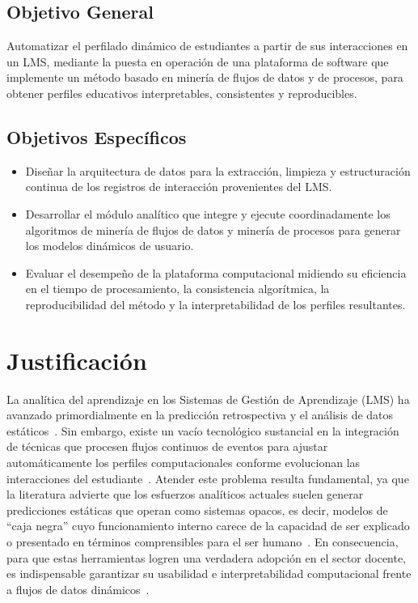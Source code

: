 \subsection{Objetivo General}
Automatizar el perfilado dinámico de estudiantes a partir de sus interacciones en un LMS, mediante la puesta en operación de una plataforma de software que implemente un método basado en minería de flujos de datos y de procesos, para obtener perfiles educativos interpretables, consistentes y reproducibles.

\subsection{Objetivos Específicos}
\begin{itemize}
    \item Diseñar la arquitectura de datos para la extracción, limpieza y estructuración continua de los registros de interacción provenientes del LMS.
    \item Desarrollar el módulo analítico que integre y ejecute coordinadamente los algoritmos de minería de flujos de datos y minería de procesos para generar los modelos dinámicos de usuario.
    \item Evaluar el desempeño de la plataforma computacional midiendo su eficiencia en el tiempo de procesamiento, la consistencia algorítmica, la reproducibilidad del método y la interpretabilidad de los perfiles resultantes.
\end{itemize}

\section{Justificación}
La analítica del aprendizaje en los Sistemas de Gestión de Aprendizaje (LMS) ha avanzado primordialmente en la predicción retrospectiva y el análisis de datos estáticos~\cite{Mercado2024,Setiadi2025}. Sin embargo, existe un vacío tecnológico sustancial en la integración de técnicas que procesen flujos continuos de eventos para ajustar automáticamente los perfiles computacionales conforme evolucionan las interacciones del estudiante~\cite{YeseniaZavaleta-Sanchez2025}. Atender este problema resulta fundamental, ya que la literatura advierte que los esfuerzos analíticos actuales suelen generar predicciones estáticas que operan como sistemas opacos, es decir, modelos de ``caja negra'' cuyo funcionamiento interno carece de la capacidad de ser explicado o presentado en términos comprensibles para el ser humano~\cite{BarredoArrieta2020,Lee2025}. En consecuencia, para que estas herramientas logren una verdadera adopción en el sector docente, es indispensable garantizar su usabilidad e interpretabilidad computacional frente a flujos de datos dinámicos~\cite{Desai2025,Lee2025}.

